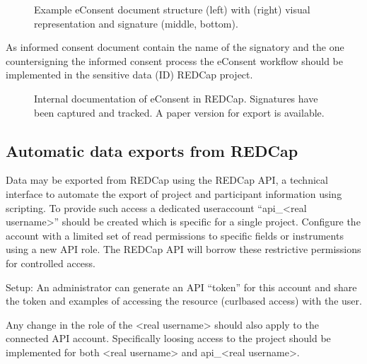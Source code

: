 \documentclass[letterpaper,10pt,english]{sphinxmanual}
\begin{document}
\begin{figure}[htbp]
\centering
\capstart

\noindent{}
\caption{Example e\sphinxhyphen{}Consent document structure (left) with (right) visual representation and signature (middle, bottom).}\label{\detokenize{EndUser/index:id6}}\end{figure}

\sphinxAtStartPar
As informed consent document contain the name of the signatory and the one countersigning the informed consent process the e\sphinxhyphen{}Consent workflow should be implemented in the sensitive data (ID) REDCap project.

\begin{figure}[htbp]
\centering
\capstart

\noindent{}
\caption{Internal documentation of e\sphinxhyphen{}Consent in REDCap. Signatures have been captured and tracked. A paper version for export is available.}\label{\detokenize{EndUser/index:id7}}\end{figure}


\subsection{Automatic data exports from REDCap}
\label{\detokenize{EndUser/index:automatic-data-exports-from-redcap}}
\sphinxAtStartPar
Data may be exported from REDCap using the REDCap API, a technical interface to automate the export of project and participant information using scripting. To provide such access a dedicated user\sphinxhyphen{}account “api\_\textless{}real username\textgreater{}” should be created which is specific for a single project. Configure the account with a limited set of read permissions to specific fields or instruments using a new API role. The REDCap API will borrow these restrictive permissions for controlled access.

\sphinxAtStartPar
Setup: An administrator can generate an API “token” for this account and share the token and examples of accessing the resource (curl\sphinxhyphen{}based access) with the user.

\sphinxAtStartPar
Any change in the role of the \textless{}real username\textgreater{} should also apply to the connected API account. Specifically loosing access to the project should be implemented for both \textless{}real username\textgreater{} and api\_\textless{}real username\textgreater{}.
\end{document}
